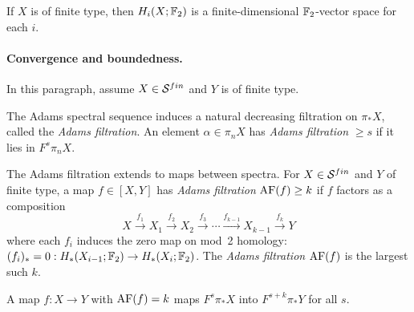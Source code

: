 \begin{axiom}\label{prereq:ax:finite-type-homology}
    If $X$ is of finite type, then $H_i(X; {\mathbb F}_2)$ is a finite-dimensional ${\mathbb F}_2$-vector space for each $i$.
\end{axiom}

\paragraph{Convergence and boundedness.}

In this paragraph, assume $X \in {\mathcal S}^{fin}$ and $Y$ is of finite type.

\begin{definition}\label{prereq:def:adams-filtration}
    \leanok
    The Adams spectral sequence induces a natural decreasing filtration on $\pi_* X$, called the \emph{Adams filtration}. An element $\alpha \in \pi_n X$ has \emph{Adams filtration} $\ge s$ if it lies in $F^s \pi_n X$.
\end{definition}

\begin{definition}\label{prereq:def:adams-filtration-maps}
    \leanok
    The Adams filtration extends to maps between spectra. For $X \in {\mathcal S}^{fin}$ and $Y$ of finite type, a map $f \in [X, Y]$ has \emph{Adams filtration} $\mathrm{AF}(f) \ge k$ if $f$ factors as a composition
    $$X \xrightarrow{f_1} X_1 \xrightarrow{f_2} X_2 \xrightarrow{f_3} \cdots \xrightarrow{f_{k-1}} X_{k-1} \xrightarrow{f_k} Y$$
    where each $f_i$ induces the zero map on mod~2 homology: $(f_i)_* = 0: H_*(X_{i-1}; {\mathbb F}_2) \to H_*(X_i; {\mathbb F}_2)$. The \emph{Adams filtration} $\mathrm{AF}(f)$ is the largest such $k$.
\end{definition}

\begin{proposition}\label{prereq:prop:adams-filtration-characterization}
    \leanok
    A map $f: X \to Y$ with $\mathrm{AF}(f) = k$ maps $F^s \pi_* X$ into $F^{s+k} \pi_* Y$ for all $s$.
\end{proposition}


